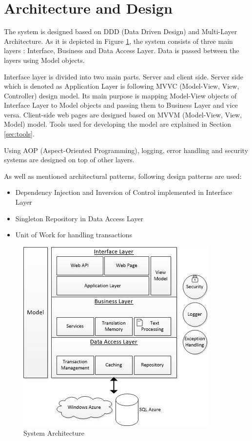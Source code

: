 \section{Architecture and Design}
\label{sec:architecture}
The system is designed based on DDD (Data Driven Design) and Multi-Layer Architecture. As it is depicted in Figure \ref{fig:architecture}, the system consists of three main layers : Interface, Business and Data Access Layer. Data is passed between the layers using Model objects.

Interface layer is divided into two main parts. Server and client side. Server side which is denoted as Application Layer is following MVVC (Model-View, View, Controller) design model. Its main purpose is mapping Model-View objects of Interface Layer to Model objects and passing them to Business Layer and vice versa. Client-side web pages are designed based on MVVM (Model-View, View, Model) model. Tools used for developing the model are explained in Section \ref{sec:tools}.

Using AOP (Aspect-Oriented Programming), logging, error handling and security systems are designed on top of other layers.

As well as mentioned architectural patterns, following design patterns are used:
\begin{itemize}
	\item Dependency Injection and Inversion of Control implemented in Interface Layer
	\item Singleton Repository in Data Access Layer
	\item Unit of Work for handling transactions
\end{itemize} 

\begin{figure}[h]
\begin{center}
\includegraphics[scale=0.9]{figures/architecture.jpg}
\caption{System Architecture
\label{fig:architecture}}
\end{center}
\end{figure}